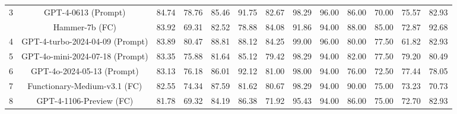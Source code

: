 \documentclass{article}
\begin{document}
\begin{table}[h]
{\begin{tabular}{ccccccccccccc}
3                      & GPT-4-0613 (Prompt)                            & 84.74                         & 78.76  & 85.46    & 91.75    & 82.67                                                       & 98.29  & 96.00    & 86.00    & 70.00                                                       & 75.57                         & 82.93                       \\
\rowcolor[HTML]{EFEFEF} 
                       & Hammer-7b (FC)                                 & 83.92                         & 69.31  & 82.52    & 78.88    & 84.08                                                       & 91.86  & 94.00    & 88.00    & 85.00                                                       & 72.87                         & 92.68                       \\
4                      & GPT-4-turbo-2024-04-09 (Prompt)                & 83.89                         & 80.47  & 88.81    & 88.12    & 84.25                                                       & 99.00  & 96.00    & 80.00    & 77.50                                                       & 61.82                         & 82.93                       \\
5                      & GPT-4o-mini-2024-07-18 (Prompt)                & 83.35                         & 75.88  & 81.64    & 85.12    & 79.42                                                       & 98.29  & 94.00    & 82.00    & 77.50                                                       & 79.20                         & 80.49                       \\
6                      & GPT-4o-2024-05-13 (Prompt)                     & 83.13                         & 76.18  & 86.01    & 92.12    & 81.00                                                       & 98.00  & 94.00    & 76.00    & 72.50                                                       & 77.44                         & 78.05                       \\
7                      & Functionary-Medium-v3.1 (FC)                   & 82.55                         & 74.34  & 87.59    & 81.62    & 80.67                                                       & 98.29  & 94.00    & 90.00    & 75.00                                                       & 73.23                         & 70.73                       \\
8                      & GPT-4-1106-Preview (FC)                        & 81.78                         & 69.32  & 84.19    & 86.38    & 71.92                                                       & 95.43  & 94.00    & 86.00    & 75.00                                                       & 72.70                         & 82.93                       \\

\end{tabular}}
\end{table}
\end{document}
